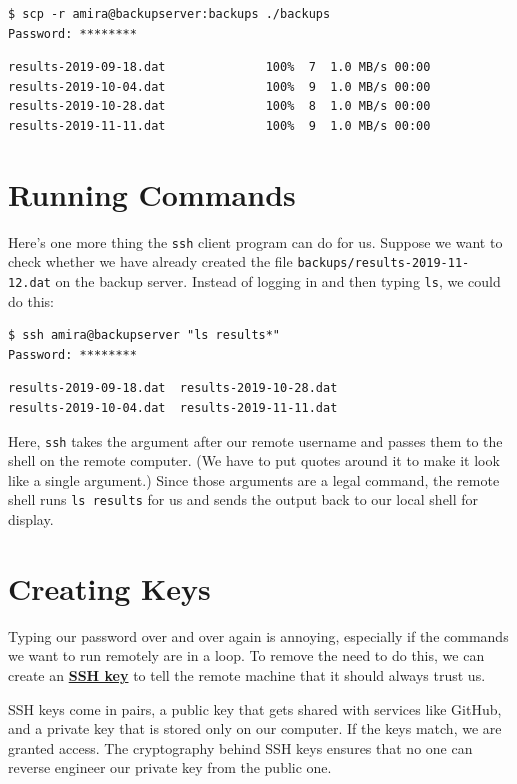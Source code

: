 \documentclass[
]{krantz}
\newcommand{\gref}[2]{\hyperlink{#2}{\textbf{#1}}}
\begin{document}
\begin{verbatim}
$ scp -r amira@backupserver:backups ./backups
Password: ********
\end{verbatim}

\begin{verbatim}
results-2019-09-18.dat              100%  7  1.0 MB/s 00:00
results-2019-10-04.dat              100%  9  1.0 MB/s 00:00
results-2019-10-28.dat              100%  8  1.0 MB/s 00:00
results-2019-11-11.dat              100%  9  1.0 MB/s 00:00
\end{verbatim}

\hypertarget{ssh-cmd}{%
\section{Running Commands}\label{ssh-cmd}}

Here's one more thing the \texttt{ssh} client program can do for us.
Suppose we want to check whether we have already created the file
\texttt{backups/results-2019-11-12.dat} on the backup server.
Instead of logging in and then typing \texttt{ls},
we could do this:

\begin{verbatim}
$ ssh amira@backupserver "ls results*"
Password: ********
\end{verbatim}

\begin{verbatim}
results-2019-09-18.dat  results-2019-10-28.dat
results-2019-10-04.dat  results-2019-11-11.dat
\end{verbatim}

Here, \texttt{ssh} takes the argument after our remote username
and passes them to the shell on the remote computer.
(We have to put quotes around it to make it look like a single argument.)
Since those arguments are a legal command,
the remote shell runs \texttt{ls\ results} for us
and sends the output back to our local shell for display.

\hypertarget{ssh-keys}{%
\section{Creating Keys}\label{ssh-keys}}

Typing our password over and over again is annoying,
especially if the commands we want to run remotely are in a loop.
To remove the need to do this,
we can create an \gref{SSH key}{ssh\_key}
to tell the remote machine
that it should always trust us.

SSH keys come in pairs, a public key that gets shared with services like GitHub,
and a private key that is stored only on our computer. If the keys match,
we are granted access.
The cryptography behind SSH keys ensures that no one can reverse engineer our
private key from the public one.
\end{document}
